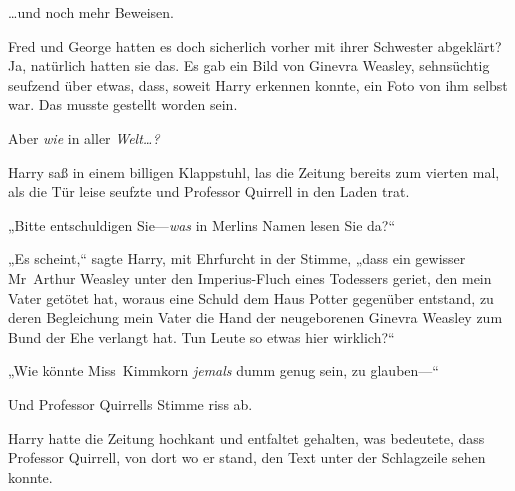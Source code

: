…und noch mehr Beweisen.

Fred und George hatten es doch sicherlich vorher mit ihrer Schwester abgeklärt? Ja, natürlich hatten sie das. Es gab ein Bild von Ginevra Weasley, sehnsüchtig seufzend über etwas, dass, soweit Harry erkennen konnte, ein Foto von ihm selbst war. Das musste gestellt worden sein.

Aber \emph{wie} in aller \emph{Welt…?}

Harry saß in einem billigen Klappstuhl, las die Zeitung bereits zum vierten mal, als die Tür leise seufzte und Professor Quirrell in den Laden trat.

„Bitte entschuldigen Sie—\emph{was} in Merlins Namen lesen Sie da?“

„Es scheint,“ sagte Harry, mit Ehrfurcht in der Stimme, „dass ein gewisser Mr~Arthur Weasley unter den Imperius-Fluch eines Todessers geriet, den mein Vater getötet hat, woraus eine Schuld dem Haus Potter gegenüber entstand, zu deren Begleichung mein Vater die Hand der neugeborenen Ginevra Weasley zum Bund der Ehe verlangt hat. Tun Leute so etwas hier wirklich?“

„Wie könnte Miss~Kimmkorn \emph{jemals} dumm genug sein, zu glauben—“

Und Professor Quirrells Stimme riss ab.

Harry hatte die Zeitung hochkant und entfaltet gehalten, was bedeutete, dass Professor Quirrell, von dort wo er stand, den Text unter der Schlagzeile sehen konnte.

